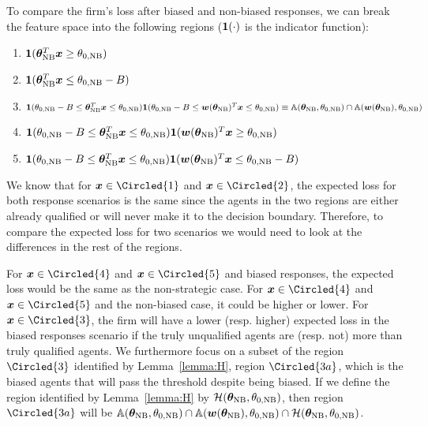 To compare the firm's loss after biased and non-biased responses, we can break the feature space into the following regions ($\bm{1}(\cdot)$ is the indicator function):
\begin{enumerate}[label=\large\protect\textcircled{\small\arabic*}]
    \item $\bm{1}({\bm{\theta}}_\text{NB}^T{\bm{x}}\ge\theta_{0, \text{NB}})$
    \item $\bm{1}({\bm{\theta}}_\text{NB}^T{\bm{x}}\le\theta_{0, \text{NB}}-B)$
    \item $\bm{1}(\theta_{0, \text{NB}}-B\le{\bm{\theta}}_\text{NB}^T{\bm{x}}\le\theta_{0, \text{NB}})\bm{1}(\theta_{0, \text{NB}}-B\le{\bm{w}}({\bm{\theta}}_\text{NB})^T{\bm{x}}\le\theta_{0, \text{NB}}) \equiv {\mathbb{A}}({\bm{\theta}}_\text{NB}, \theta_{0, \text{NB}})\cap {\mathbb{A}}({\bm{w}}({\bm{\theta}}_\text{NB}), \theta_{0, \text{NB}})$
    \item $\bm{1}(\theta_{0, \text{NB}}-B\le{\bm{\theta}}_\text{NB}^T{\bm{x}}\le\theta_{0, \text{NB}})\bm{1}({\bm{w}}({\bm{\theta}}_\text{NB})^T{\bm{x}}\ge\theta_{0, \text{NB}})$
    \item $\bm{1}(\theta_{0, \text{NB}}-B\le{\bm{\theta}}_\text{NB}^T{\bm{x}}\le\theta_{0, \text{NB}})\bm{1}({\bm{w}}({\bm{\theta}}_\text{NB})^T{\bm{x}}\le\theta_{0, \text{NB}}-B)$
\end{enumerate}

We know that for $\vx\in {\Circled{1}}$ and $\vx\in\Circled{2}$, the expected loss for both response scenarios is the same since the agents in the two regions are either already qualified or will never make it to the decision boundary. Therefore, to compare the expected loss for two scenarios we would need to look at the differences in the rest of the regions. 

For $\vx\in\Circled{4}$ and $\vx\in\Circled{5}$ and biased responses, the expected loss would be the same as the non-strategic case. For $\vx\in\Circled{4}$ and $\vx\in\Circled{5}$ and the non-biased case, it could be higher or lower. For $\vx\in\Circled{3}$, the firm will have a lower (resp. higher) expected loss in the biased responses scenario if the truly unqualified agents are (resp. not) more than truly qualified agents. We furthermore focus on a subset of the region $\Circled{3}$ identified by Lemma~\ref{lemma:H}, region $\Circled{3a}$, which is the biased agents that will pass the threshold despite being biased. If we define the region identified by Lemma~\ref{lemma:H} by $\mathcal{H}({\bm{\theta}}_\text{NB}, \theta_{0, \text{NB}})$, then region $\Circled{3a}$ will be ${\mathbb{A}}({\bm{\theta}}_\text{NB}, \theta_{0, \text{NB}})\cap {\mathbb{A}}({\bm{w}}({\bm{\theta}}_\text{NB}), \theta_{0, \text{NB}}) \cap\mathcal{H}({\bm{\theta}}_\text{NB}, \theta_{0, \text{NB}})$. 

